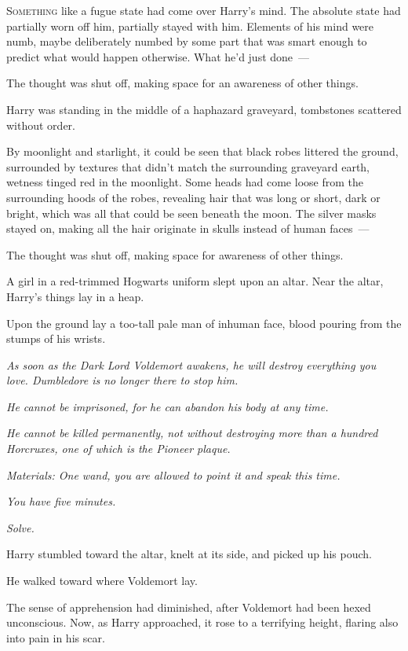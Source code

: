 
\lettrine{S}{omething} like a fugue state had come over Harry's mind. The absolute state had
partially worn off him, partially stayed with him. Elements of his mind were
numb, maybe deliberately numbed by some part that was smart enough to predict
what would happen otherwise. What he'd just done~---

The thought was shut off, making space for an awareness of other things.

Harry was standing in the middle of a haphazard graveyard, tombstones scattered
without order.

By moonlight and starlight, it could be seen that black robes littered the
ground, surrounded by textures that didn't match the surrounding graveyard
earth, wetness tinged red in the moonlight. Some heads had come loose from the
surrounding hoods of the robes, revealing hair that was long or short, dark or
bright, which was all that could be seen beneath the moon. The silver masks
stayed on, making all the hair originate in skulls instead of human faces~---

The thought was shut off, making space for awareness of other things.

A girl in a red-trimmed Hogwarts uniform slept upon an altar. Near the altar,
Harry's things lay in a heap.

Upon the ground lay a too-tall pale man of inhuman face, blood pouring from the
stumps of his wrists.

\emph{As soon as the Dark Lord Voldemort awakens, he will destroy everything
you love. Dumbledore is no longer there to stop him.}

\emph{He cannot be imprisoned, for he can abandon his body at any time.}

\emph{He cannot be killed permanently, not without destroying more than a
hundred Horcruxes, one of which is the Pioneer plaque.}

\emph{Materials: One wand, you are allowed to point it and speak this time.}

\emph{You have five minutes.}

\emph{Solve.}

Harry stumbled toward the altar, knelt at its side, and picked up his pouch.

He walked toward where Voldemort lay.

The sense of apprehension had diminished, after Voldemort had been hexed
unconscious. Now, as Harry approached, it rose to a terrifying height, flaring
also into pain in his scar.


